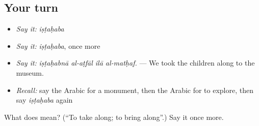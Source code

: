 \subsection*{Your turn}
\begin{itemize}
\raggedright
  \item \emph{Say it:} \emph{iṣṭaḥaba}
  \item \emph{Say it:} \emph{iṣṭaḥaba}, once more
  \item \emph{Say it:} \emph{iṣṭaḥabnā al-aṭfāl ilā al-matḥaf.} — We took the children along to the museum.
  \item \emph{Recall:} say the Arabic for a monument, then the Arabic for to explore, then say \emph{iṣṭaḥaba} again
\end{itemize}

\begin{tcolorbox}[breakable,colback=teal!4,colframe=teal!35!black,title={Before you move on}]
What does  mean? (\textquotedblleft{}To take along; to bring along\textquotedblright{}.) Say it once more.
\end{tcolorbox}
